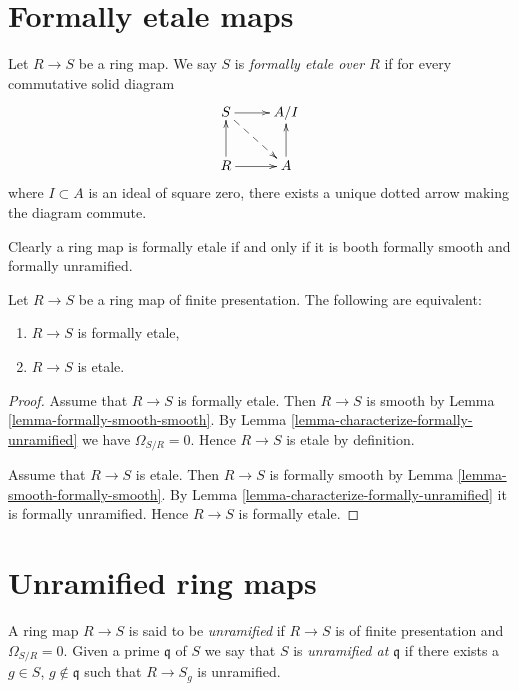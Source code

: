 \section{Formally etale maps}
\label{section-formally-etale}

\begin{definition}
\label{definition-formally-etale}
Let $R \to S$ be a ring map.
We say $S$ is {\it formally etale over $R$} if for every
commutative solid diagram
$$
\xymatrix{
S \ar[r] \ar@{-->}[rd] & A/I \\
R \ar[r] \ar[u] & A \ar[u]
}
$$
where $I \subset A$ is an ideal of square zero, there exists
a unique dotted arrow making the diagram commute.
\end{definition}

\noindent
Clearly a ring map is formally etale if and only if
it is booth formally smooth and formally unramified.

\begin{lemma}
\label{lemma-formally-etale-etale}
Let $R \to S$ be a ring map of finite presentation.
The following are equivalent:
\begin{enumerate}
\item $R \to S$ is formally etale,
\item $R \to S$ is etale.
\end{enumerate}
\end{lemma}

\begin{proof}
Assume that $R \to S$ is formally etale.
Then $R \to S$ is smooth by Lemma \ref{lemma-formally-smooth-smooth}.
By Lemma \ref{lemma-characterize-formally-unramified}
we have $\Omega_{S/R} = 0$.
Hence $R \to S$ is etale by definition.

\medskip\noindent
Assume that $R \to S$ is etale.
Then $R \to S$ is formally smooth by
Lemma \ref{lemma-smooth-formally-smooth}.
By Lemma \ref{lemma-characterize-formally-unramified}
it is formally unramified. Hence $R \to S$ is formally etale.
\end{proof}






\section{Unramified ring maps}
\label{section-unramified}

\begin{definition}
\label{definition-unramified}
A ring map $R \to S$ is said to be
{\it unramified} if $R \to S$ is of finite presentation and
$\Omega_{S/R} = 0$.
Given a prime $\mathfrak q$ of $S$ we say that $S$ is {\it unramified
at $\mathfrak q$} if there exists a $g \in S$, $g \not \in \mathfrak q$
such that $R \to S_g$ is unramified.
\end{definition}

